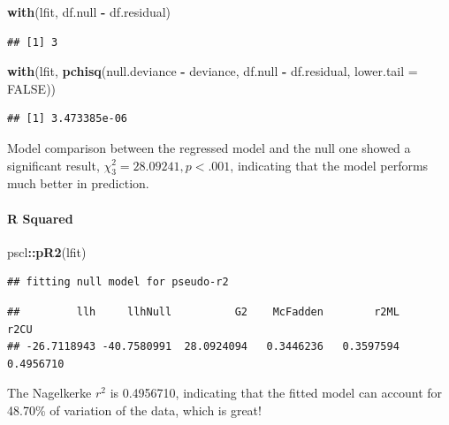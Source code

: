 \documentclass[
]{ctexart}
\newenvironment{Shaded}{\begin{snugshade}}{\end{snugshade}}
\newcommand{\AttributeTok}[1]{\textcolor[rgb]{0.13,0.29,0.53}{#1}}
\newcommand{\ConstantTok}[1]{\textcolor[rgb]{0.56,0.35,0.01}{#1}}
\newcommand{\FunctionTok}[1]{\textcolor[rgb]{0.13,0.29,0.53}{\textbf{#1}}}
\newcommand{\NormalTok}[1]{#1}
\newcommand{\SpecialCharTok}[1]{\textcolor[rgb]{0.81,0.36,0.00}{\textbf{#1}}}
\begin{document}
\begin{Shaded}
\begin{Highlighting}[]
\FunctionTok{with}\NormalTok{(lfit, df.null }\SpecialCharTok{{-}}\NormalTok{ df.residual)}
\end{Highlighting}
\end{Shaded}

\begin{verbatim}
## [1] 3
\end{verbatim}

\begin{Shaded}
\begin{Highlighting}[]
\FunctionTok{with}\NormalTok{(lfit, }\FunctionTok{pchisq}\NormalTok{(null.deviance }\SpecialCharTok{{-}}\NormalTok{ deviance, }
\NormalTok{                 df.null }\SpecialCharTok{{-}}\NormalTok{ df.residual, }
                 \AttributeTok{lower.tail =} \ConstantTok{FALSE}\NormalTok{))}
\end{Highlighting}
\end{Shaded}

\begin{verbatim}
## [1] 3.473385e-06
\end{verbatim}

Model comparison between the regressed model and the null one showed a
significant result, \(\chi_3^2=28.09241,p<.001\), indicating that the
model performs much better in prediction.

\hypertarget{r-squared}{%
\paragraph{R Squared}\label{r-squared}}

\begin{Shaded}
\begin{Highlighting}[]
\NormalTok{pscl}\SpecialCharTok{::}\FunctionTok{pR2}\NormalTok{(lfit)}
\end{Highlighting}
\end{Shaded}

\begin{verbatim}
## fitting null model for pseudo-r2
\end{verbatim}

\begin{verbatim}
##         llh     llhNull          G2    McFadden        r2ML        r2CU 
## -26.7118943 -40.7580991  28.0924094   0.3446236   0.3597594   0.4956710
\end{verbatim}

The Nagelkerke \(r^2\) is 0.4956710, indicating that the fitted model
can account for 48.70\% of variation of the data, which is great!
\end{document}
